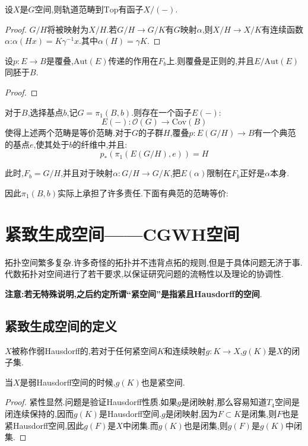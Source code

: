 \begin{lemma}
    设$X$是$G$空间,则轨道范畴到$\mathrm{Top}$有函子$X/(-)$.
\end{lemma}
\begin{proof}
    $G/H$将被映射为$X/H$.若$G/H \to G/K$有$G$映射$\alpha$,则$X/H \to X/K$有连续函数$\alpha$:$\alpha(Hx)=K\gamma^{-1}x$.其中$\alpha(H)=\gamma K$.
\end{proof}
\begin{proposition}
    设$p:E \to B$是覆叠,$\mathrm{Aut}(E)$传递的作用在$F_b$上.则覆叠是正则的,并且$E/\mathrm{Aut}(E)$同胚于$B$.
\end{proposition}
\begin{proof}
    
\end{proof}
\begin{theorem}
    对于$B$,选择基点$b$,记$G=\pi_1(B,b)$.则存在一个函子$E(-)$:
    $$
    E(-):\mathcal{O}(G)\to \mathrm{Cov}(B)
    $$
    使得上述两个范畴是等价范畴.对于$G$的子群$H$,覆叠$p:E(G/H) \to B$有一个典范的基点$e$,使其处于$b$的纤维中,并且:
    $$
    p_*(\pi_1(E(G/H),e))=H
    $$

    此时,$F_b=G/H$,并且对于映射$\alpha:G/H \to G/K$,把$E(\alpha)$限制在$F_b$正好是$\alpha$本身.
\end{theorem}
因此$\pi_1(B,b)$实际上承担了许多责任.下面有典范的范畴等价:


\chapter{紧致生成空间——CGWH空间}
拓扑空间繁多复杂.许多奇怪的拓扑并不违背点拓的规则,但是于具体问题无济于事.代数拓扑对空间进行了若干要求,以保证研究问题的流畅性以及理论的协调性.


\textbf{注意:若无特殊说明,之后约定所谓“紧空间”是指紧且Hausdorff的空间}.

\section{紧致生成空间的定义}
\begin{definition}
    $X$被称作弱Hausdorff的,若对于任何紧空间$K$和连续映射$g:K \to X$,$g(K)$是$X$的闭子集.
\end{definition}
\begin{lemma}
    当$X$是弱Hausdorff空间的时候,$g(K)$也是紧空间.
\end{lemma}
\begin{proof}
    紧性显然.问题是验证Hausdorff性质.如果$g$是闭映射,那么容易知道$T_4$空间是闭连续保持的,因而$g(K)$是Hausdorff空间.$g$是闭映射,因为$F \subset K$是闭集,则$F$也是紧Hausdorff空间,因此$g(F)$是$X$中闭集.而$g(K)$也是闭集,则$g(F)$是$g(K)$中闭集.
\end{proof}

